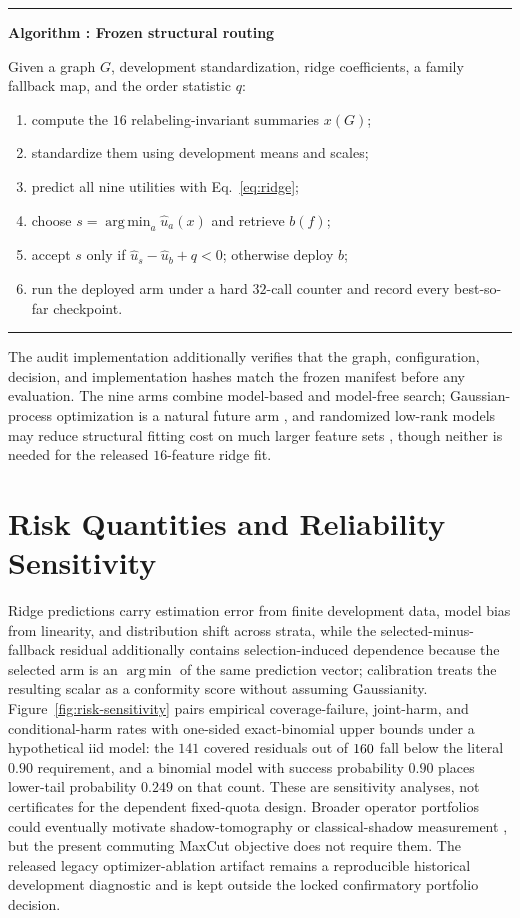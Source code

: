 \documentclass[10pt,twocolumn]{article}
\newcounter{algorithm}
\newenvironment{algorithm}[1]{%
  \refstepcounter{algorithm}\par\medskip\noindent
  \begin{minipage}{\linewidth}
  \hrule\smallskip
  \textbf{Algorithm \thealgorithm: #1}\par\smallskip
}{%
  \smallskip\hrule
  \end{minipage}\par\medskip
}
\newcommand{\argminop}{\operatorname*{arg\,min}}
\begin{document}
\begin{algorithm}{Frozen structural routing}
\label{alg:frozen-routing}
Given a graph $G$, development standardization, ridge coefficients, a family
fallback map, and the order statistic $q$:
\begin{enumerate}
\item compute the $16$ relabeling-invariant summaries $x(G)$;
\item standardize them using development means and scales;
\item predict all nine utilities with Eq.~\eqref{eq:ridge};
\item choose $s=\argminop_a\widehat u_a(x)$ and retrieve $b(f)$;
\item accept $s$ only if $\widehat u_s-\widehat u_b+q<0$; otherwise deploy $b$;
\item run the deployed arm under a hard $32$-call counter and record every
best-so-far checkpoint.
\end{enumerate}
\end{algorithm}
The audit implementation additionally verifies that the graph, configuration,
decision, and implementation hashes match the frozen manifest before any
evaluation.  The nine arms combine model-based and model-free search;
Gaussian-process optimization is a natural future arm
\citep{snoek2012practical,balandat2020botorch}, and randomized low-rank models
may reduce structural fitting cost on much larger feature sets
\citep{martinsson2020randomized}, though neither is needed for the released
$16$-feature ridge fit.

\section{Risk Quantities and Reliability Sensitivity}
\label{app:risk}

Ridge predictions carry estimation error from finite development data, model bias
from linearity, and distribution shift across strata, while the
selected-minus-fallback residual additionally contains selection-induced
dependence because the selected arm is an $\argminop$ of the same prediction
vector; calibration treats the resulting scalar as a conformity score without
assuming Gaussianity.  Figure~\ref{fig:risk-sensitivity} pairs empirical
coverage-failure, joint-harm, and conditional-harm rates with one-sided
exact-binomial upper bounds under a hypothetical iid model: the $141$ covered
residuals out of $160$ fall below the literal $0.90$ requirement, and a
binomial model with success probability $0.90$ places lower-tail probability
$0.249$ on that count.  These are sensitivity analyses, not certificates for the
dependent fixed-quota design.  Broader operator portfolios could eventually
motivate shadow-tomography or classical-shadow measurement
\citep{aaronson2018shadow,huang2020shadows}, but the present commuting MaxCut
objective does not require them.  The released legacy optimizer-ablation
artifact remains a reproducible historical development diagnostic and is kept
outside the locked confirmatory portfolio decision.
\end{document}
